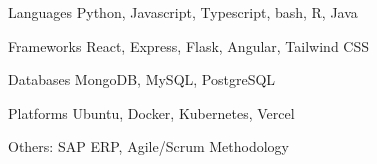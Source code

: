 

\begin{cvskills}

  \cvskill
  {Languages} %
  {} %
  {Python, Javascript, Typescript, bash, R, Java} %

  \cvskill
  {Frameworks} %
  {} %
  {React, Express, Flask, Angular, Tailwind CSS} %

  \cvskill
  {Databases} %
  {} %
  {MongoDB, MySQL, PostgreSQL} %

  \cvskill
  {Platforms} %
  {} %
  {Ubuntu, Docker, Kubernetes, Vercel} %


  \cvskill
  {Others:} %
  {} %
  {SAP ERP, Agile/Scrum Methodology} %



\end{cvskills}
